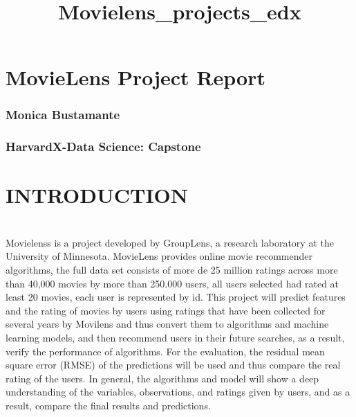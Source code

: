 \documentclass[11pt]{article}
\title{Movielens\_projects\_edx}
\begin{document}
    
    
    \maketitle
    
    

    
    \section{MovieLens Project Report}\label{movielens-project-report}

    \subsubsection{Monica Bustamante}\label{monica-bustamante}

    \subsubsection{HarvardX-Data Science:
Capstone}\label{harvardx-data-science-capstone}

    \section{}\label{section}

    \section{INTRODUCTION}\label{introduction}

    \section{}\label{section}

    Movielenss is a project developed by GroupLens, a research laboratory at
the University of Minnesota. MovieLens provides online movie recommender
algorithms, the full data set consists of more de 25 million ratings
across more than 40,000 movies by more than 250.000 users, all users
selected had rated at least 20 movies, each user is represented by id.
This project will predict features and the rating of movies by users
using ratings that have been collected for several years by Movilens and
thus convert them to algorithms and machine learning models, and then
recommend users in their future searches, as a result, verify the
performance of algorithms. For the evaluation, the residual mean square
error (RMSE) of the predictions will be used and thus compare the real
rating of the users. In general, the algorithms and model will show a
deep understanding of the variables, observations, and ratings given by
users, and as a result, compare the final results and predictions.
\end{document}
